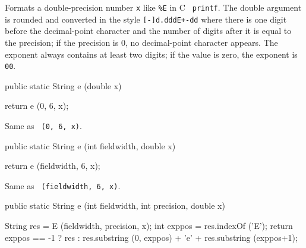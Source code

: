 \begin{tabb} Formats a double-precision number \texttt{x} like \texttt{\%E} in C {\tt
printf}.  The double argument is rounded and converted in the
style \texttt{[-]d.dddE+-dd} where there is one digit  before
the  decimal-point character and the number of digits
after it is equal to the precision;
if the precision is 0, no decimal-point character appears.
The  exponent  always
contains at least two digits; if the value is zero,
the exponent is \texttt{00}.
%
\end{tabb}
\begin{htmlonly}
\end{htmlonly}
\begin{code}

   public static String e (double x)\begin{hide} {
        return e (0, 6, x);
   }\end{hide}
\end{code}
\begin{tabb}   Same as ~\texttt{(0, 6, x)}.
\end{tabb}
\begin{htmlonly}
\end{htmlonly}
\begin{code}

   public static String e (int fieldwidth, double x)\begin{hide} {
        return e (fieldwidth, 6, x);
   }\end{hide}
\end{code}
\begin{tabb}   Same as ~\texttt{(fieldwidth, 6, x)}.
\end{tabb}
\begin{htmlonly}
\end{htmlonly}
\begin{code}

   public static String e (int fieldwidth, int precision, double x)\begin{hide} {
        String res = E (fieldwidth, precision, x);
        int exppos = res.indexOf ('E');
        return exppos == -1 ? res : res.substring (0,
                               exppos) + 'e' + res.substring (exppos+1);
   }\end{hide}
\end{code}
